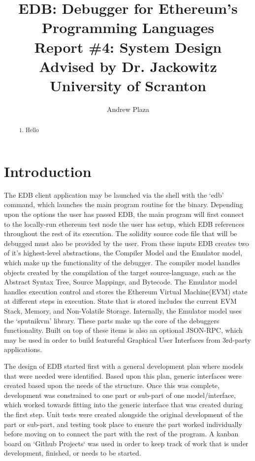 \documentclass{report}
\title{%
    EDB: Debugger for Ethereum's Programming Languages \\
	\medskip
	\large Report \#4: System Design \\
    \large Advised by Dr. Jackowitz	\\
	\large University of Scranton}
\author{Andrew Plaza}
\begin{document}
\maketitle
\newpage

\begin{abstract}
    \begin{enumerate}
        \item Hello
    \end{enumerate}
\end{abstract}

\tableofcontents
\newpage

\section{Introduction}
    The EDB client application may be launched via the shell with the `edb' command, which launches the main program routine for the binary. Depending upon the options the user has passed EDB, the main program will first connect to the locally-run ethereum test node the user has setup, which EDB references throughout the rest of its execution. The solidity source code file that will be debugged must also be provided by the user. From these inputs EDB creates two of it's highest-level abstractions, the Compiler Model and the Emulator model, which make up the functionality of the debugger. The compiler model handles objects created by the compilation of the target source-language, such as the Abstract Syntax Tree, Source Mappings, and Bytecode. The Emulator model handles execution control and stores the Ethereum Virtual Machine(EVM) state at different steps in execution. State that is stored includes the current EVM Stack, Memory, and Non-Volatile Storage. Internally, the Emulator model uses the `sputnikvm' library. These parts make up the core of the debuggers functionality. Built on top of these items is also an optional JSON-RPC, which may be used in order to build featureful Graphical User Interfaces from 3rd-party applications.

    The design of EDB started first with a general development plan where models that were needed were identified. Based upon this plan, generic interfaces were created based upon the needs of the structure. Once this was complete, development was constrained to one part or sub-part of one model/interface, which worked towards fitting into the generic interface that was created during the first step. Unit tests were created alongside the original development of the part or sub-part, and testing took place to ensure the part worked individually before moving on to connect the part with the rest of the program. A kanban board on `Github Projects` was used in order to keep track of work that is under development, finished, or needs to be started.
\end{document}
